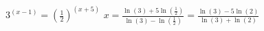 {$3^{(x - 1)} = \left(\frac{1}{2}\right)^{(x + 5)}$ }
{$x = \frac{\ln(3) + 5\ln\left(\frac{1}{2}\right)}{\ln(3) - \ln\left(\frac{1}{2}\right)} = \frac{\ln(3)-5\ln(2)}{\ln(3)+\ln(2)}$}